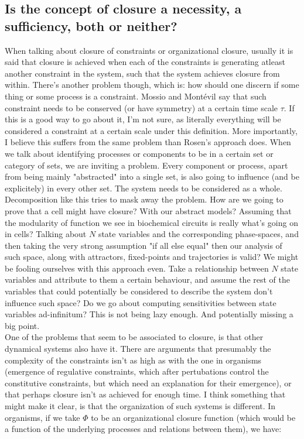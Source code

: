 \documentclass[a4paper,12pt,twoside,leqno]{article}
\begin{document}
\subsection*{Is the concept of closure a necessity, a sufficiency, both or neither?}
When talking about closure of constraints or organizational closure, usually it is said that closure is achieved when each of the constraints is generating atleast another constraint in the system, such that the system achieves closure from within. There's another problem though, which is: how should one discern if some thing or some process is a constraint. Mossio and Montévil say that such constraint needs to be conserved (or have symmetry) at a certain time scale $\tau$. If this is a good way to go about it, I'm not sure, as literally everything will be considered a constraint at a certain scale under this definition. More importantly, I believe this suffers from the same problem than Rosen's approach does. When we talk about identifying processes or components to be in a certain set or category of sets, we are inviting a problem. Every component or process, apart from being mainly "abstracted" into a single set, is also going to influence (and be explicitely) in every other set. The system needs to be considered as a whole. Decomposition like this tries to mask away the problem. How are we going to prove that a cell might have closure? With our abstract models? Assuming that the modularity of function we see in biochemical circuits is really what's going on in cells? Talking about $N$ state variables and the corresponding phase-spaces, and then taking the very strong assumption "if all else equal" then our analysis of such space, along with attractors, fixed-points and trajectories is valid? We might be fooling ourselves with this approach even. Take a relationship between $N$ state variables and attribute to them a certain behaviour, and assume the rest of the variables that could potentially be considered to describe the system don't influence such space? Do we go about computing sensitivities between state variables ad-infinitum? This is not being lazy enough. And potentially missing a big point.\\
One of the problems that seem to be associated to closure, is that other dynamical systems also have it. There are arguments that presumably the complexity of the constraints isn't as high as with the one in organisms (emergence of regulative constraints, which after pertubations control the constitutive constraints, but which need an explanation for their emergence), or that perhaps closure isn't as achieved for enough time. I think something that might make it clear, is that the organization of such systems is different. In organisms, if we take $\Phi$ to be an organizational closure function (which would be a function of the underlying processes and relations between them), we have:
\end{document}
